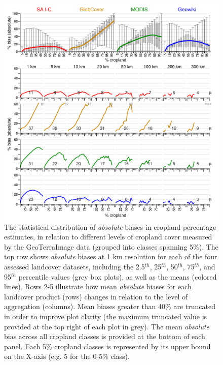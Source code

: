 \documentclass[11 pt]{article}
\begin{document}
\begin{figure}[H]
\includegraphics[width = \linewidth]{../figures/bias_abs.pdf}
\caption{The statistical distribution of \emph{absolute} biases in cropland percentage estimates, in relation to different levels of cropland cover measured by the GeoTerraImage data (grouped into classes spanning 5\%). The top row shows \emph{absolute} biases at 1 km resolution for each of the four assessed landcover datasets, including the 2.5$^{th}$, 25$^{th}$, 50$^{th}$, 75$^{th}$, and 95$^{th}$ percentile values (grey box plots), as well as the means (colored lines). Rows 2-5 illustrate how mean \emph{absolute} biases for each landcover product (rows) changes in relation to the level of aggregation (columns). Mean biases greater than 40\% are truncated in order to improve plot clarity (the maximum truncated value is provided at the top right of each plot in grey). The mean \emph{absolute} bias across all cropland classes is provided at the bottom of each panel. Each 5\% cropland classes is represented by its upper bound on the X-axis (e.g. 5 for the 0-5\% class).}
\end{figure}
\end{document}
